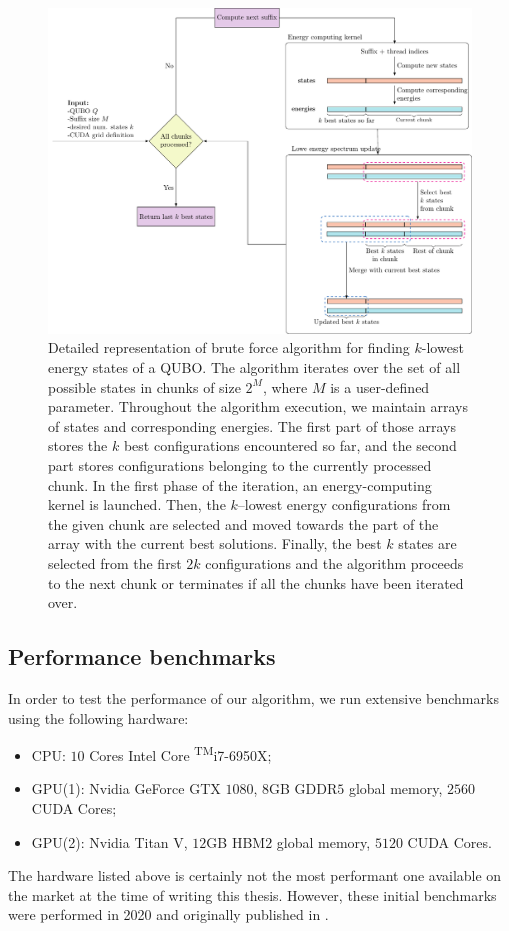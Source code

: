 \begin{figure}
  \includegraphics[width=\textwidth]{figures/bruteforce}
  \caption{
    Detailed representation of brute force algorithm for finding $k$-lowest energy
    states of a QUBO. The algorithm iterates over the set of all possible states in
    chunks of size $2^{M}$, where $M$ is a user-defined parameter. Throughout the
        algorithm execution, we maintain arrays of states and corresponding energies.
        The first part of those arrays stores the $k$ best configurations encountered
        so far, and the second part stores configurations belonging to the currently
        processed chunk. In the first phase of the iteration, an energy-computing
        kernel is launched. Then, the $k$--lowest energy configurations from the given
        chunk are selected and moved towards the part of the array with the current
        best solutions. Finally, the best $k$ states are selected from the first $2k$
    configurations and the algorithm proceeds to the next chunk or terminates if
    all the chunks have been iterated over. } \label{fig:bruteforce}
\end{figure}

\subsection{Performance benchmarks}
In order to test the performance of our algorithm, we run extensive benchmarks
using the following hardware:
%
\begin{itemize}
  \item CPU:
    {$10$
      Cores {\rmfamily Intel\textregistered} Core \textsuperscript{TM}i7-6950X};
  \item GPU(1):
    Nvidia
      GeForce GTX $1080$, $8$GB GDDR$5$ global memory, $2560$ CUDA Cores;
  \item  GPU(2): {Nvidia Titan V,
      $12$GB HBM$2$ global memory, $5120$ CUDA Cores}.
\end{itemize}
The hardware listed above is certainly not the most performant
one available on the market at the time of writing this thesis. However, these initial
benchmarks were performed in 2020 and originally published in \cite{bruteforce}.

